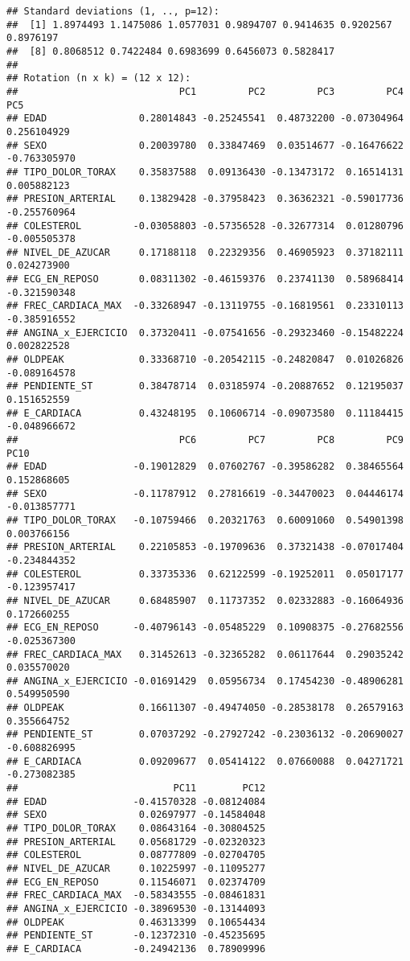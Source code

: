 \documentclass[
]{article}
\begin{document}
\begin{verbatim}
## Standard deviations (1, .., p=12):
##  [1] 1.8974493 1.1475086 1.0577031 0.9894707 0.9414635 0.9202567 0.8976197
##  [8] 0.8068512 0.7422484 0.6983699 0.6456073 0.5828417
## 
## Rotation (n x k) = (12 x 12):
##                            PC1         PC2         PC3         PC4          PC5
## EDAD                0.28014843 -0.25245541  0.48732200 -0.07304964  0.256104929
## SEXO                0.20039780  0.33847469  0.03514677 -0.16476622 -0.763305970
## TIPO_DOLOR_TORAX    0.35837588  0.09136430 -0.13473172  0.16514131  0.005882123
## PRESION_ARTERIAL    0.13829428 -0.37958423  0.36362321 -0.59017736 -0.255760964
## COLESTEROL         -0.03058803 -0.57356528 -0.32677314  0.01280796 -0.005505378
## NIVEL_DE_AZUCAR     0.17188118  0.22329356  0.46905923  0.37182111  0.024273900
## ECG_EN_REPOSO       0.08311302 -0.46159376  0.23741130  0.58968414 -0.321590348
## FREC_CARDIACA_MAX  -0.33268947 -0.13119755 -0.16819561  0.23310113 -0.385916552
## ANGINA_x_EJERCICIO  0.37320411 -0.07541656 -0.29323460 -0.15482224  0.002822528
## OLDPEAK             0.33368710 -0.20542115 -0.24820847  0.01026826 -0.089164578
## PENDIENTE_ST        0.38478714  0.03185974 -0.20887652  0.12195037  0.151652559
## E_CARDIACA          0.43248195  0.10606714 -0.09073580  0.11184415 -0.048966672
##                            PC6         PC7         PC8         PC9         PC10
## EDAD               -0.19012829  0.07602767 -0.39586282  0.38465564  0.152868605
## SEXO               -0.11787912  0.27816619 -0.34470023  0.04446174 -0.013857771
## TIPO_DOLOR_TORAX   -0.10759466  0.20321763  0.60091060  0.54901398  0.003766156
## PRESION_ARTERIAL    0.22105853 -0.19709636  0.37321438 -0.07017404 -0.234844352
## COLESTEROL          0.33735336  0.62122599 -0.19252011  0.05017177 -0.123957417
## NIVEL_DE_AZUCAR     0.68485907  0.11737352  0.02332883 -0.16064936  0.172660255
## ECG_EN_REPOSO      -0.40796143 -0.05485229  0.10908375 -0.27682556 -0.025367300
## FREC_CARDIACA_MAX   0.31452613 -0.32365282  0.06117644  0.29035242  0.035570020
## ANGINA_x_EJERCICIO -0.01691429  0.05956734  0.17454230 -0.48906281  0.549950590
## OLDPEAK             0.16611307 -0.49474050 -0.28538178  0.26579163  0.355664752
## PENDIENTE_ST        0.07037292 -0.27927242 -0.23036132 -0.20690027 -0.608826995
## E_CARDIACA          0.09209677  0.05414122  0.07660088  0.04271721 -0.273082385
##                           PC11        PC12
## EDAD               -0.41570328 -0.08124084
## SEXO                0.02697977 -0.14584048
## TIPO_DOLOR_TORAX    0.08643164 -0.30804525
## PRESION_ARTERIAL    0.05681729 -0.02320323
## COLESTEROL          0.08777809 -0.02704705
## NIVEL_DE_AZUCAR     0.10225997 -0.11095277
## ECG_EN_REPOSO       0.11546071  0.02374709
## FREC_CARDIACA_MAX  -0.58343555 -0.08461831
## ANGINA_x_EJERCICIO -0.38969530 -0.13144093
## OLDPEAK             0.46313399  0.10654434
## PENDIENTE_ST       -0.12372310 -0.45235695
## E_CARDIACA         -0.24942136  0.78909996
\end{verbatim}
\end{document}
